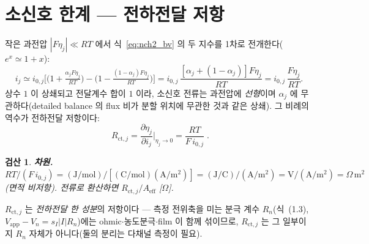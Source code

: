 \documentclass[11pt,a4paper]{article}
\newtheorem*{verifybox}{검산}
\newcommand{\eff}{\mathrm{eff}}
\newcommand{\app}{\mathrm{app}}
\newcommand{\ct}{\mathrm{ct}}
\begin{document}
\section{소신호 한계 — 전하전달 저항}\label{sec:nch2_rct}
작은 과전압 $|F\eta_j|\ll RT$ 에서 식~\eqref{eq:nch2_bv} 의 두 지수를 1차로 전개한다($e^x\simeq1+x$):
\begin{equation}
i_j\simeq i_{0,j}\Big[\big(1+\tfrac{\alpha_jF\eta_j}{RT}\big)-\big(1-\tfrac{(1-\alpha_j)F\eta_j}{RT}\big)\Big]
=i_{0,j}\,\frac{[\alpha_j+(1-\alpha_j)]F\eta_j}{RT}=i_{0,j}\,\frac{F\eta_j}{RT}.
\label{eq:nch2_lin}
\end{equation}
상수 $1$ 이 상쇄되고 전달계수 합이 $1$ 이라, 소신호 전류는 과전압에 \emph{선형}이며 $\alpha_j$ 에 무관하다(detailed
balance 의 flux 비가 분할 위치에 무관한 것과 같은 상쇄). 그 비례의 역수가 전하전달 저항이다:
\begin{equation}
\boxed{\;R_{\ct,j}=\frac{\partial\eta_j}{\partial i_j}\Big|_{\eta_j\to0}=\frac{RT}{F\,i_{0,j}}\;.}
\label{eq:nch2_rct}
\end{equation}
\begin{verifybox}
\textbf{차원.} $RT/(F\,i_{0,j})=\mathrm{(J/mol)}/[\mathrm{(C/mol)(A/m^2)}]=\mathrm{(J/C)/(A/m^2)}
=\mathrm V/(\mathrm{A/m^2})=\Omega\,\mathrm{m^2}$(면적 비저항). 전류로 환산하면 $R_{\ct,j}/A_\eff$ [$\Omega$].
\end{verifybox}
$R_{\ct,j}$ 는 \emph{전하전달 한 성분}의 저항이다 — 측정 전위축을 미는 분극 계수 $R_n$(식~(1.3),
$V_\app-V_n=s_I|I|R_n$)에는 ohmic$\cdot$농도분극$\cdot$film 이 함께 섞이므로, $R_{\ct,j}$ 는 그 일부이지 $R_n$
자체가 아니다(둘의 분리는 다채널 측정이 필요).

\end{document}
